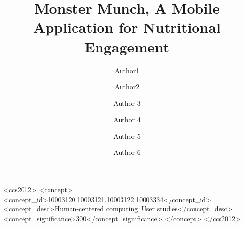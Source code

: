 \documentclass[manuscript, screen]{acmart}
\begin{document}
\title{Monster Munch, A Mobile Application for Nutritional Engagement}

\author{Author1}
\email{}
\orcid{}
\author{Author2}
\authornotemark[1]
\email{}

\author{Author 3}

\author{Author 4}

\author{Author 5}

\author{Author 6}


\renewcommand{\shortauthors}{Author1 and Author2, et al.}






\begin{CCSXML}
<ccs2012>
   <concept>
       <concept_id>10003120.10003121.10003122.10003334</concept_id>
       <concept_desc>Human-centered computing~User studies</concept_desc>
       <concept_significance>300</concept_significance>
       </concept>
 </ccs2012>
\end{CCSXML}

\end{document}
